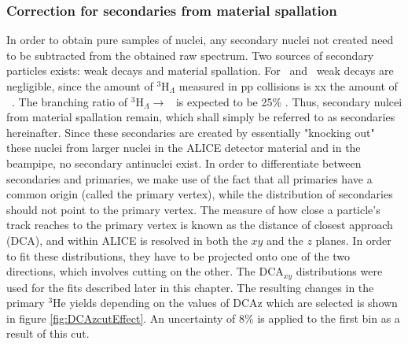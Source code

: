

\subsubsection{Correction for secondaries from material spallation}\label{sec:Meth:secondaryCorr}
In order to obtain pure samples of nuclei, any secondary nuclei not created need to be subtracted from the obtained raw spectrum. Two sources of secondary particles exists: weak decays and material spallation. For \ahe\ and \atrit\, weak decays are negligible, since the amount of $^3\mathrm{H}_\Lambda$ measured in pp collisions is xx the amount of \ahe\ \cite{}. The branching ratio of $^3\mathrm{H}_\Lambda \rightarrow $ \ahe\ is expected to be 25\% \cite{PDG}. Thus, secondary nulcei from material spallation remain, which shall simply be referred to as secondaries hereinafter. Since these secondaries are created by essentially "knocking out" these nuclei from larger nuclei in the ALICE detector material and in the beampipe, no secondary antinuclei exist. In order to differentiate between secondaries and primaries, we make use of the fact that all primaries have a common origin (called the primary vertex), while the distribution of secondaries should not point to the primary vertex. The measure of how close a particle's track reaches to the primary vertex is known as the distance of closest approach (DCA), and within ALICE is resolved in both the $xy$ and the $z$ planes. In order to fit these distributions, they have to be projected onto one of the two directions, which involves cutting on the other. The DCA$_{xy}$ distributions were used for the fits described later in this chapter. The resulting changes in the primary $^3\mathrm{He}$ yields depending on the values of DCAz which are selected is shown in figure \ref{fig:DCAzcutEffect}. An uncertainty of 8\% is applied to the first bin as a result of this cut.


